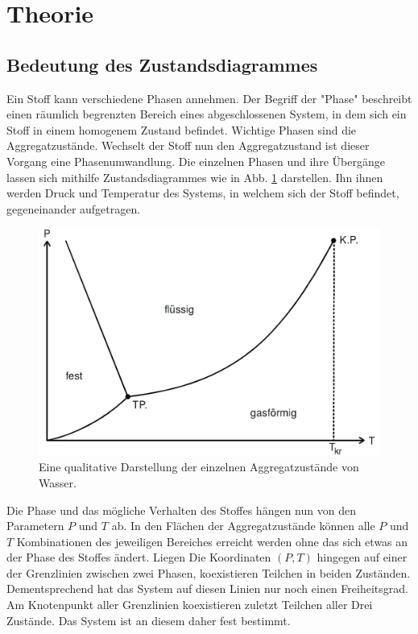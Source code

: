 
\section{Theorie}
\label{sec:Theorie}
\subsection{Bedeutung des Zustandsdiagrammes}
Ein Stoff kann verschiedene Phasen annehmen. Der Begriff der "Phase" beschreibt
 einen räumlich begrenzten Bereich eines abgeschlossenen System, in dem sich ein Stoff
  in einem homogenem Zustand befindet. Wichtige Phasen sind die Aggregatzustände.
  Wechselt der Stoff nun den Aggregatzustand ist dieser Vorgang eine Phasenumwandlung.
  Die einzelnen Phasen und ihre Übergänge lassen sich mithilfe Zustandsdiagrammes
   wie in Abb. \ref{fig:diagram} darstellen. Ihn ihnen werden Druck und Temperatur
    des Systems, in welchem sich der Stoff befindet, gegeneinander aufgetragen.
  \begin{figure}
	\centering
	\includegraphics[width=\linewidth-150pt,height=\textheight-150pt,keepaspectratio]{content/Bilder/zustand.png}
	\caption{Eine qualitative Darstellung der einzelnen Aggregatzustände von Wasser\cite{V203}.}
	\label{fig:diagram}
\end{figure}
  Die Phase und das mögliche Verhalten des Stoffes hängen nun von den Parametern $P$ und $T$ ab.
  In den Flächen der Aggregatzustände können alle $P$ und $T$
   Kombinationen des jeweiligen Bereiches erreicht werden ohne das sich etwas an der Phase des Stoffes ändert.
    Liegen Die Koordinaten $(P,T)$ hingegen auf einer der Grenzlinien zwischen
    zwei Phasen, koexistieren Teilchen in beiden Zuständen.
    Dementsprechend hat das System auf diesen Linien nur noch einen Freiheitsgrad.
    Am Knotenpunkt aller Grenzlinien koexistieren zuletzt Teilchen aller Drei
     Zustände. Das System ist an diesem daher fest bestimmt.

